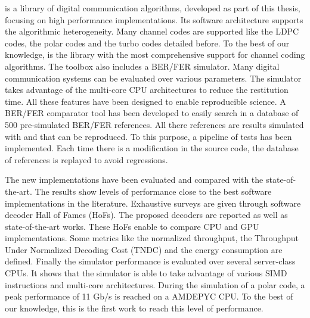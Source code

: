 \AFFECT is a library of digital communication algorithms, developed as part of
this thesis, focusing on high performance implementations. Its software
architecture supports the algorithmic heterogeneity. Many channel codes are
supported like the LDPC codes, the polar codes and the turbo codes detailed
before. To the best of our knowledge, \AFFECT is the library with the most
comprehensive support for channel coding algorithms. The toolbox also includes a
BER/FER simulator. Many digital communication systems can be evaluated over
various parameters. The simulator takes advantage of the multi-core CPU
architectures to reduce the restitution time. All these features have been
designed to enable reproducible science. A BER/FER comparator tool has been
developed to easily search in a database of 500 pre-simulated BER/FER
references. All there references are results simulated with \AFFECT and that can
be reproduced. To this purpose, a pipeline of tests has been implemented. Each
time there is a modification in the source code, the database of references is
replayed to avoid regressions.

The new implementations have been evaluated and compared with the
state-of-the-art. The results show levels of performance close to the best
software implementations in the literature. Exhaustive surveys are given through
software decoder Hall of Fames (HoFs). The proposed decoders are reported as
well as state-of-the-art works. These HoFs enable to compare CPU and GPU
implementations. Some metrics like the normalized throughput, the Throughput
Under Normalized Decoding Cost (TNDC) and the energy consumption are defined.
Finally the \AFFECT simulator performance is evaluated over several server-class
CPUs. It shows that the simulator is able to take advantage of various SIMD
instructions and multi-core architectures. During the simulation of a polar
code, a peak performance of 11 Gb/s is reached on a AMD\R EPYC CPU. To the best
of our knowledge, this is the first work to reach this level of performance.

